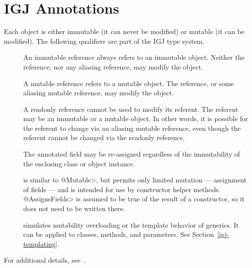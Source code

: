 \section{IGJ Annotations\label{igj-annotations}}

Each object is either immutable (it can never be modified) or mutable (it
can be modified).  The following qualifiers are part of the IGJ type system.

\begin{description}

\item[]
  An immutable reference always refers to an immutable object.  Neither the
  reference, nor any aliasing reference, may modify the object.

\item[]
  A mutable reference refers to a mutable object.  The reference, or some
  aliasing mutable reference, may modify the object.

\item[]
  A readonly reference cannot be used to modify its referent.  The referent
  may be an immutable or a mutable object.  In other words, it is possible
  for the referent to change via an aliasing mutable reference, even though
  the referent cannot be changed via the readonly reference.

\item[]
  The annotated field may be re-assigned regardless of the
  immutability of the enclosing class or object instance.

\item[]
  is similar to \<@Mutable>, but permits only limited mutation ---
  assignment of fields --- and is intended for use by constructor helper
  methods.  \<@AssignsFields> is assumed to be true of the result of a
  constructor, so it does not need to be written there.

\item[]
  simulates mutability overloading or the template behavior of generics.
  It can be applied to classes, methods, and parameters.  See
  Section~\ref{igj-templating}.

\end{description}

For additional details, see~\cite{ZibinPAAKE2007}.


